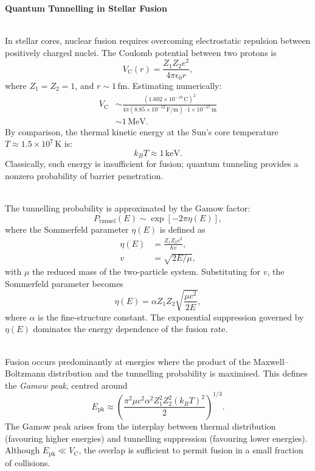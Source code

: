 \begin{technical}
    {\Large\textbf{Quantum Tunnelling in Stellar Fusion}}
    
    \\[0.5em]
    In stellar cores, nuclear fusion requires overcoming electrostatic repulsion between positively charged nuclei. The Coulomb potential between two protons is
    \[
    V_\text{C}(r) = \frac{Z_1 Z_2 e^2}{4\pi \epsilon_0 r},
    \]
    where \( Z_1 = Z_2 = 1 \), and \( r \sim 1\,\text{fm} \). Estimating numerically:
    \begin{align*}
    V_\text{C} &\sim \frac{(1.602 \times 10^{-19}\,\text{C})^2}{4\pi (8.85 \times 10^{-12}\,\text{F/m}) \cdot 1 \times 10^{-15}\,\text{m}}\\
               &\sim 1\,\text{MeV}.
    \end{align*}
    By comparison, the thermal kinetic energy at the Sun’s core temperature \( T \approx 1.5 \times 10^7\,\text{K} \) is:
    \[
    k_B T \approx 1\,\text{keV}.
    \]
    Classically, such energy is insufficient for fusion; quantum tunneling provides a nonzero probability of barrier penetration.
    
    \vspace{0.7em}
    \\[0.5em]
    The tunnelling probability is approximated by the Gamow factor:
    \[
    P_\text{tunnel}(E) \sim \exp\left[-2\pi \eta(E)\right],
    \]
    where the Sommerfeld parameter \(\eta(E)\) is defined as
    \begin{align*}
    \eta(E) &= \frac{Z_1 Z_2 e^2}{\hbar v}, \\
    v &= \sqrt{2E/\mu},
    \end{align*}
    with \(\mu\) the reduced mass of the two-particle system. Substituting for \(v\), the Sommerfeld parameter becomes
    \[
    \eta(E) = \alpha Z_1 Z_2 \sqrt{\frac{\mu c^2}{2E}},
    \]
    where \(\alpha\) is the fine-structure constant. The exponential suppression governed by \(\eta(E)\) dominates the energy dependence of the fusion rate.
    
    \vspace{0.7em}
    \\[0.5em]
    Fusion occurs predominantly at energies where the product of the Maxwell–Boltzmann distribution and the tunnelling probability is maximised. This defines the \emph{Gamow peak}, centred around
    \[
    E_\text{pk} \approx \left( \frac{\pi^2 \mu c^2 \alpha^2 Z_1^2 Z_2^2 (k_B T)^2}{2} \right)^{1/3}.
    \]
    The Gamow peak arises from the interplay between thermal distribution (favouring higher energies) and tunnelling suppression (favouring lower energies). Although \( E_\text{pk} \ll V_\text{C} \), the overlap is sufficient to permit fusion in a small fraction of collisions.
    

\end{technical}

